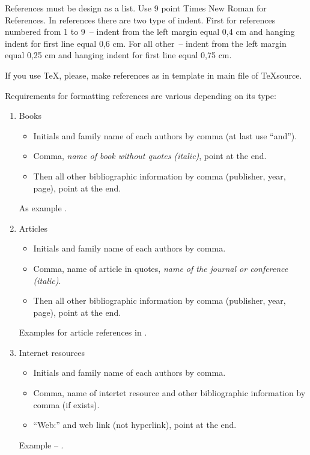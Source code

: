 \documentclass[conference]{IEEEtran}
\begin{document}
References must be design as a list. Use 9 point Times New Roman for References. In references there are two type of indent. First for references numbered from 1 to 9~-- indent from the left margin equal 0,4 cm and hanging indent for first line equal 0,6 cm. For all other~-- indent from the left margin equal 0,25 cm and hanging indent for first line equal 0,75 cm.

If you use \TeX, please, make references as in template in main file of \TeX  source. 

Requirements for formatting references are various depending on its type:
\begin{enumerate}
	\item Books
	
		\begin{itemize}
			\item Initials and family name of each authors by comma (at last use ``and'').
			\item Comma, \textit{name of book without quotes (italic)}, point at the end.
			\item Then all other bibliographic information by comma (publisher, year, page), point at the end.
		\end{itemize}	
		
		As example \cite{Cover}.
 	\item Articles
 
 		\begin{itemize}
			\item Initials and family name of each authors by comma.
			\item Comma, name of article in quotes, \textit{name of the journal or conference (italic)}.
			\item Then all other bibliographic information by comma (publisher, year, page), point at the end.
		\end{itemize}	
		
		Examples for article references in \cite{Dobrushin, Blachman}.
	\item Internet resources
	
 		\begin{itemize}
			\item Initials and family name of each authors by comma.
			\item Comma, name of intertet resource and other bibliographic information by comma (if exists).
			\item ``Web:'' and web link (not hyperlink), point at the end.
		\end{itemize}	
		
		Example -- \cite{IEEE}.
\end{enumerate}
\end{document}
